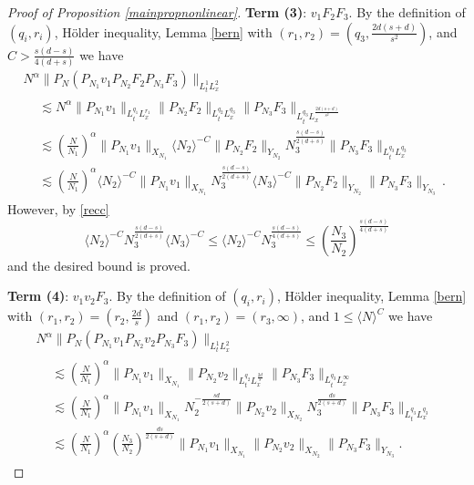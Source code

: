 \documentclass[10pt,leqno]{amsart}
\numberwithin{equation}{section}
\begin{document}
\begin{proof}[Proof of Proposition \ref{mainpropnonlinear}]
\textbf{Term (3)}: $v_1 F_2 F_3$.
 By the definition of $(q_i, r_i)$, H\" older inequality,  Lemma \ref{bern} with $(r_1, r_2) = (q_3, \frac{2d(s+d)}{s^2})$, and $C > \frac{s(d-s)}{4(d + s)}$ we have
\begin{multline*}
 N^\alpha \|P_N (P_{N_1} v_1  P_{N_2} F_2 P_{N_3} F_3) \|_{L_t^{1} L_x^{2}}\\
\begin{aligned}
& \lesssim  N^\alpha \|P_{N_1} v_1\|_{L^{q_1}_tL^{r_1}_x} \|P_{N_2} F_2\|_{L_t^{q_2 } L_x^{q_3} } \|P_{N_3} F_3\|_{L_t^{q_3} L_x^{\frac{2d(s+d)}{s^2}}}\\
& \lesssim \left(\frac{N}{N_1}\right)^\alpha \|P_{N_1} v_1\|_{X_{N_1}} \langle N_2\rangle^{-C} \|P_{N_2} F_2\|_{Y_{N_2} }   N_3^{\frac{s(d-s)}{2(d + s)}} \|P_{N_3} F_3\|_{L_t^{q_3}L_x^{q_3}}  \\
&\lesssim  \left(\frac{N}{N_1}\right)^\alpha \langle N_2\rangle^{-C} \|P_{N_1} v_1\|_{X_{N_1}} N_3^{\frac{s(d-s)}{2(d + s)}} \langle N_3\rangle^{-C}\|P_{N_2} F_2\|_{Y_{N_2}} \|P_{N_3} F_3\|_{Y_{N_3}} \,.
\end{aligned}
\end{multline*}
However, by \eqref{recc}
$$
\langle N_2\rangle^{-C} N_3^{\frac{s(d-s)}{2(d + s)}} \langle N_3\rangle^{-C} \leq \langle N_2\rangle^{-C} N_3^{\frac{s(d-s)}{4(d + s)}} \leq  \left(\frac{N_3}{N_2}\right)^{\frac{s(d-s)}{4(d + s)}}
$$
and the desired bound is proved. 


\textbf{Term (4)}:  $v_1 v_2 F_3$.
 By the definition of $(q_i, r_i)$, H\" older inequality,  Lemma \ref{bern} with $(r_1, r_2) = (r_2, \frac{2d}{s})$ and $(r_1, r_2) = (r_3, \infty)$, and $1 \leq \langle N\rangle^C $ we have
\begin{multline*}
N^\alpha \|P_N (P_{N_1} v_1  P_{N_2} v_2 P_{N_3} F_3) \|_{L_t^{1} L_x^{2}}\\
\begin{aligned}
& \lesssim \left(\frac{N}{N_1}\right)^\alpha \|P_{N_1} v_1\|_{X_{N_1}} \|P_{N_2} v_2\|_{L_t^{q_2} L_x^{\frac{2d}{s} }} \|P_{N_3} F_3\|_{L_t^{q_3} L_x^{\infty}}\\
& \lesssim \left(\frac{N}{N_1}\right)^\alpha \|P_{N_1} v_1\|_{X_{N_1}}   N_2^{-\frac{sd}{2(s+d)}} \|P_{N_2} v_2\|_{X_{N_2}} N_3^{\frac{ds}{2(s+d)}}\|P_{N_3} F_3\|_{ L_t^{q_3 } L_x^{q_3} }  \\
&\lesssim  \left(\frac{N}{N_1}\right)^\alpha \left(\frac{N_3}{N_2}\right)^{\frac{ds}{2(s+d)}} \|P_{N_1} v_1\|_{X_{N_1}}  \|P_{N_2} v_2\|_{X_{N_2}} \|P_{N_3} F_3\|_{Y_{N_3}}.
\end{aligned}
\end{multline*}


\end{proof}
\end{document}
